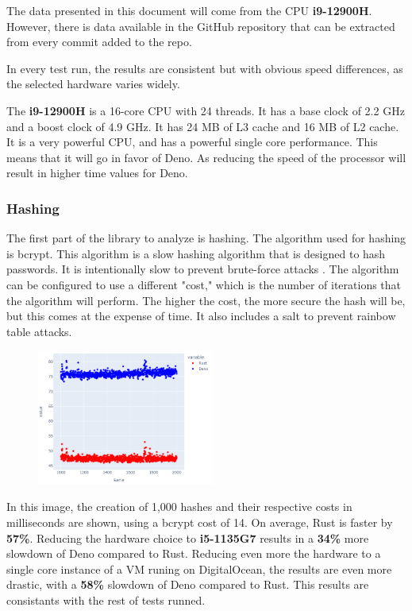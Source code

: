 \documentclass[10pt,journal,compsoc]{IEEEtran}
\begin{document}
The data presented in this document will come from the CPU \textbf{i9-12900H}. However, there is data available in the GitHub repository that can be extracted from every commit added to the repo.

In every test run, the results are consistent but with obvious speed differences, as the selected hardware varies widely.

The \textbf{i9-12900H} is a 16-core CPU with 24 threads. It has a base clock of 2.2 GHz and a boost clock of 4.9 GHz. It has 24 MB of L3 cache and 16 MB of L2 cache. It is a very powerful CPU, and has a powerful single core performance. This means that it will go in favor of Deno. As reducing the speed of the processor will result in higher time values for Deno.

\subsubsection{Hashing}

The first part of the library to analyze is hashing. The algorithm used for hashing is bcrypt. This algorithm is a slow hashing algorithm that is designed to hash passwords. It is intentionally slow to prevent brute-force attacks \cite{Bcrypt}. The algorithm can be configured to use a different "cost," which is the number of iterations that the algorithm will perform. The higher the cost, the more secure the hash will be, but this comes at the expense of time. It also includes a salt to prevent rainbow table attacks.

\begin{figure}[H]
    \centering
    \includegraphics[width=0.52\textwidth]{hashing_lines}
\end{figure}

In this image, the creation of 1,000 hashes and their respective costs in milliseconds are shown, using a bcrypt cost of 14. On average, Rust is faster by \textbf{57\%}. Reducing the hardware choice to \textbf{i5-1135G7} results in a \textbf{34\%} more slowdown of Deno compared to Rust. Reducing even more the hardware to a single core instance of a VM runing on DigitalOcean, the results are even more drastic, with a \textbf{58\%} slowdown of Deno compared to Rust. This results are consistants with the rest of tests runned.
\end{document}
